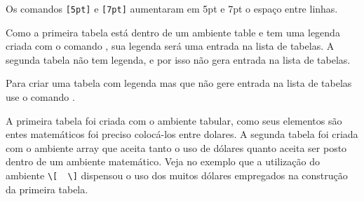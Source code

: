Os comandos \verb|[5pt]| e \verb|[7pt]| aumentaram em 
5pt e 7pt o espaço entre linhas. 

Como a primeira tabela está dentro de um ambiente table e tem uma legenda
criada com o comando , sua legenda será uma entrada na lista
de tabelas. A segunda tabela não tem legenda, e por isso não gera entrada 
na lista de tabelas.

Para criar uma tabela com legenda mas que não gere entrada na lista de 
tabelas use o comando .

A primeira tabela foi criada com o ambiente tabular, como seus elementos são 
entes matemáticos foi preciso colocá-los entre dolares. A segunda tabela foi
criada com o ambiente array que aceita tanto o uso de dólares quanto aceita 
ser posto dentro de um ambiente matemático. Veja no exemplo que a utilização 
do ambiente \verb|\[  \]| dispensou o uso dos muitos dólares empregados na 
construção da primeira tabela.

